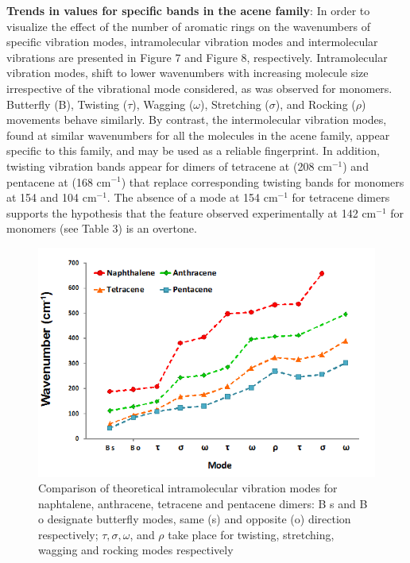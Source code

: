 \textbf{Trends in values for specific bands in the acene family}: In order to visualize the effect of the number of aromatic rings on the wavenumbers of specific vibration modes, intramolecular vibration modes and intermolecular vibrations are presented in Figure 7 and Figure 8, respectively. Intramolecular vibration modes, shift to lower wavenumbers with increasing molecule size irrespective of the vibrational mode considered, as was observed for monomers. Butterfly (B), Twisting ($\tau$), Wagging ($\omega$), Stretching ($\sigma$), and Rocking ($\rho$) movements behave similarly. By contrast, the intermolecular vibration modes, found at similar wavenumbers for all the molecules in the acene family, appear specific to this family, and may be used as a reliable fingerprint. In addition, twisting vibration bands appear for dimers of tetracene at (208 cm$^{-1}$) and pentacene at (168 cm$^{-1}$) that replace corresponding twisting bands for monomers at 154 and 104 cm$^{-1}$. The absence of a mode at 154 cm$^{-1}$ for tetracene dimers supports the hypothesis that the feature observed experimentally at 142 cm$^{-1}$ for monomers (see Table 3) is an overtone.

\begin{figure}[h]
	\centering
	\includegraphics[scale=0.85]{image/intramolecular-v}
	\caption[Comparison of theoretical intramolecular vibration modes for acenes dimers]{Comparison of theoretical intramolecular vibration modes for naphtalene, anthracene, tetracene and pentacene dimers: B s and B o designate butterfly modes, same (s) and opposite (o) direction respectively; $\tau, \sigma, \omega$, and $\rho$ take place for twisting, stretching, wagging and rocking modes respectively}
\end{figure}

